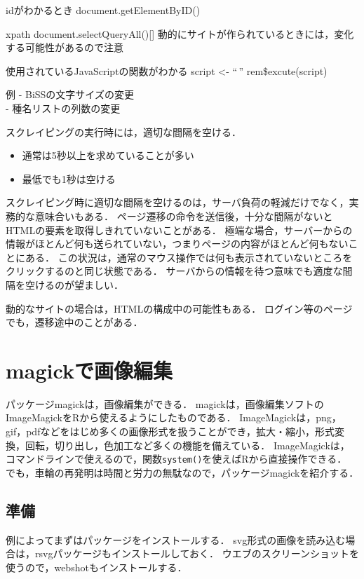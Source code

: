 \documentclass[
]{article}
\providecommand{\tightlist}{%
  \setlength{\itemsep}{0pt}\setlength{\parskip}{0pt}}
\begin{document}
idがわかるとき
document.getElementByID()

xpath
document.selectQueryAll(){[}{]}
動的にサイトが作られているときには，変化する可能性があるので注意

使用されているJavaScriptの関数がわかる
script \textless- ``\,''
rem\$excute(script)

例
- BiSSの文字サイズの変更\\
- 種名リストの列数の変更

スクレイピングの実行時には，適切な間隔を空ける．

\begin{itemize}
\tightlist
\item
  通常は5秒以上を求めていることが多い\\
\item
  最低でも1秒は空ける
\end{itemize}

スクレイピング時に適切な間隔を空けるのは，サーバ負荷の軽減だけでなく，実務的な意味合いもある．
ページ遷移の命令を送信後，十分な間隔がないとHTMLの要素を取得しきれていないことがある．
極端な場合，サーバーからの情報がほとんど何も送られていない，つまりページの内容がほとんど何もないことにある．
この状況は，通常のマウス操作では何も表示されていないところをクリックするのと同じ状態である．
サーバからの情報を待つ意味でも適度な間隔を空けるのが望ましい．

動的なサイトの場合は，HTMLの構成中の可能性もある．
ログイン等のページでも，遷移途中のことがある．

\hypertarget{magick}{%
\section{magickで画像編集}\label{magick}}

パッケージmagickは，画像編集ができる．
magickは，画像編集ソフトのImageMagickをRから使えるようにしたものである．
ImageMagickは，png，gif，pdfなどをはじめ多くの画像形式を扱うことができ，拡大・縮小，形式変換，回転，切り出し，色加工など多くの機能を備えている．
ImageMagickは，コマンドラインで使えるので，関数\texttt{system()}を使えばRから直接操作できる．
でも，車輪の再発明は時間と労力の無駄なので，パッケージmagickを紹介する．

\hypertarget{ux6e96ux5099-12}{%
\subsection{準備}\label{ux6e96ux5099-12}}

例によってまずはパッケージをインストールする．
svg形式の画像を読み込む場合は，rsvgパッケージもインストールしておく．
ウエブのスクリーンショットを使うので，webshotもインストールする．
\end{document}
